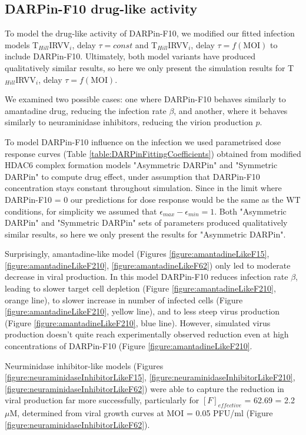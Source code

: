 \subsection{DARPin-F10 drug-like activity}

To model the drug-like activity of DARPin-F10, we modified our fitted infection models T$_{Hill}$IRVV$_i$, delay $\tau = const$ and T$_{Hill}$IRVV$_i$, delay $\tau = f(\text{MOI})$ to include DARPin-F10. Ultimately, both model variants have produced qualitatively similar results, so here we only present the simulation results for T$_{Hill}$IRVV$_i$, delay $\tau = f(\text{MOI})$.

We examined two possible cases: one where DARPin-F10 behaves similarly to amantadine drug, reducing the infection rate $\beta$, and another, where it behaves similarly to neuraminidase inhibitors, reducing the virion production $p$.

To model DARPin-F10 influence on the infection we used parametrised dose response curves (Table \ref{table:DARPinFittingCoefficients}) obtained from modified HDAC6 complex formation models "Asymmetric DARPin" and "Symmetric DARPin" to compute drug effect, under assumption that DARPin-F10 concentration stays constant throughout simulation. Since in the limit where DARPin-F10 = 0 our predictions for dose response would be the same as the WT conditions, for simplicity we assumed that $\epsilon_{max} - \epsilon_{min} = 1$. Both "Asymmetric DARPin" and "Symmetric DARPin"  sets of parameters produced qualitatively similar results, so here we only present the results for "Asymmetric DARPin".

Surprisingly, amantadine-like model (Figures \ref{figure:amantadineLikeF15}, \ref{figure:amantadineLikeF210}, \ref{figure:amantadineLikeF62}) only led to moderate decrease in viral production. In this model DARPin-F10 reduces infection rate $\beta$, leading to slower target cell depletion (Figure \ref{figure:amantadineLikeF210}, orange line), to slower increase in number of infected cells (Figure \ref{figure:amantadineLikeF210}, yellow line), and to less steep virus production (Figure \ref{figure:amantadineLikeF210}, blue line). However, simulated virus production doesn't quite reach experimentally observed reduction even at high concentrations of DARPin-F10 (Figure \ref{figure:amantadineLikeF210}.

Neurminidase inhibitor-like models (Figures \ref{figure:neuraminidaseInhibitorLikeF15}, \ref{figure:neuraminidaseInhibitorLikeF210}, \ref{figure:neuraminidaseInhibitorLikeF62}) were able to capture the reduction in viral production far more successfully, particularly for $[F]_{effective}$ = 62.69 = 2.2 $\mu$M, determined from viral growth curves at MOI = 0.05 PFU/ml (Figure \ref{figure:neuraminidaseInhibitorLikeF62}).

